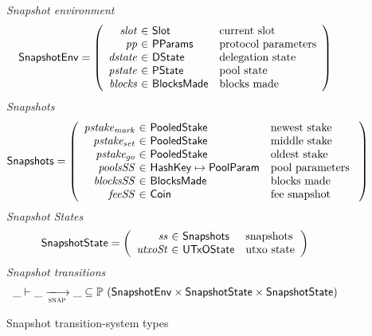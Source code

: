 \begin{figure}[htb]
  \emph{Snapshot environment}
  \begin{equation*}
    \SnapshotEnv =
    \left(
      \begin{array}{r@{~\in~}ll}
        \var{slot} & \Slot & \text{current slot}\\
        \var{pp} & \PParams & \text{protocol parameters}\\
        \var{dstate} & \DState & \text{delegation state}\\
        \var{pstate} & \PState & \text{pool state}\\
        \var{blocks} & \BlocksMade & \text{blocks made}\\
      \end{array}
    \right)
  \end{equation*}
  \emph{Snapshots}
  \begin{equation*}
    \Snapshots =
    \left(
      \begin{array}{r@{~\in~}ll}
        \var{pstake_{mark}} & \PooledStake & \text{newest stake}\\
        \var{pstake_{set}} & \PooledStake & \text{middle stake}\\
        \var{pstake_{go}} & \PooledStake & \text{oldest stake}\\
        \var{poolsSS} & \HashKey \mapsto \PoolParam & \text{pool parameters }\\
        \var{blocksSS} & \BlocksMade & \text{blocks made }\\
        \var{feeSS} & \Coin & \text{fee snapshot}\\
      \end{array}
    \right)
  \end{equation*}
  \emph{Snapshot States}
  \begin{equation*}
    \SnapshotState =
    \left(
      \begin{array}{r@{~\in~}ll}
        \var{ss} & \Snapshots & \text{snapshots}\\
        \var{utxoSt} & \UTxOState & \text{utxo state}\\
      \end{array}
    \right)
  \end{equation*}
  \emph{Snapshot transitions}
  \begin{equation*}
    \_ \vdash
    \var{\_} \trans{snap}{} \var{\_}
    \subseteq \powerset (\SnapshotEnv \times \SnapshotState \times \SnapshotState)
  \end{equation*}
  \caption{Snapshot transition-system types}
  \label{fig:ts-types:snapshot}
\end{figure}

